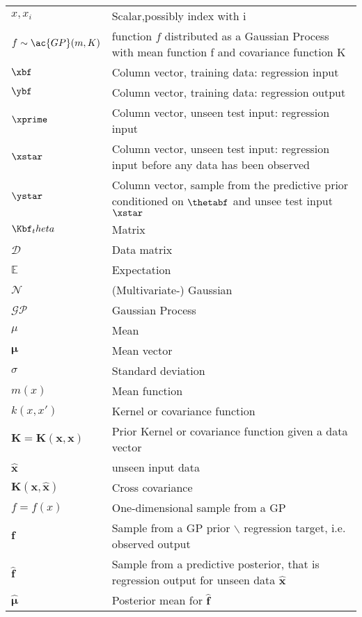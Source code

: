 
\begin{tabular}{l l}
 $x,x_i$ 			& Scalar,possibly index with i   \\
$f \sim \ac{GP}(m,K)$   & function $f$ distributed as a Gaussian Process with
mean function f and covariance function K \\
 $\xbf$			& Column vector, training data: regression input    \\
 $\ybf$			& Column vector, training data: regression output    \\
 $\xprime$		& Column vector, unseen test input: regression input    \\
$\xstar$         & Column vector, unseen test
input: regression input before any data has been observed    \\
$\ystar$		& Column vector, sample from the predictive prior
conditioned on $\thetabf$ and unsee test input $\xstar$ \\
 $\Kbf_theta$		& Matrix    \\
 $\mathcal{D}$		& Data matrix \\
 $\mathbb{E}$		& Expectation    \\
 $\mathcal{N}$		& (Multivariate-) Gaussian \\
 $\mathcal{GP}$		& Gaussian Process \\
 $\mu$                  & Mean \\
 $\bm{\mu}$             & Mean vector \\
 $\sigma$               & Standard deviation \\
 $m(x)$                 & Mean function \\
 $k(x,x')$              & Kernel or covariance function \\
 $\mathbf{K}=\mathbf{K}(\mathbf{x},\mathbf{x})$& Prior Kernel or covariance function given a data vector \\
 $\mathbf{\hat{x}}$     & unseen input data \\
 $\mathbf{K}(\mathbf{x},\mathbf{\hat{x}})$& Cross covariance \\
 $f = f(x)$             & One-dimensional sample from a GP \\
 $\mathbf{f}$           &  Sample from a GP prior $\backslash$ regression target, i.e. observed output \\
 $\mathbf{\hat{f}}$     &  Sample from a predictive posterior, that is regression output for unseen data $\mathbf{\hat{x}}$\\
 $\bm{\hat{\mu}}$       & Posterior mean for $\mathbf{\hat{f}}$ \\

\end{tabular}
